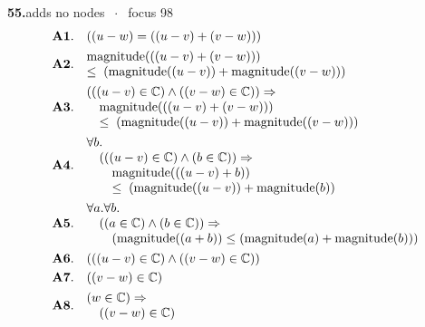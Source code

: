 \documentclass[11pt]{article}
\theoremstyle{plain}
\newcommand{\fit}[1]{\resizebox{\ifdim\width>\linewidth\linewidth\else\width\fi}{!}{#1}}
\begin{document}
\medskip\noindent\textbf{55.}\quad \fit{\texttt{(crs)}}\hfill{\small adds no nodes $\;\cdot\;$ focus 98}\\[2pt]
\begin{align*}
  \mathbf{A1.}\quad & ((u - w) = ((u - v) + (v - w))) \\
  \mathbf{A2.}\quad & \begin{array}{@{}l@{}} \operatorname{magnitude}(((u - v) + (v - w))) \\ \leq\; (\operatorname{magnitude}((u - v)) + \operatorname{magnitude}((v - w))) \end{array} \\
  \mathbf{A3.}\quad & \begin{array}{@{}l@{}} (((u - v) \in \mathbb{C}) \wedge ((v - w) \in \mathbb{C})) \Rightarrow  \\ \quad \operatorname{magnitude}(((u - v) + (v - w))) \\ \quad \leq\; (\operatorname{magnitude}((u - v)) + \operatorname{magnitude}((v - w))) \end{array} \\
  \mathbf{A4.}\quad & \begin{array}{@{}l@{}} \forall b. \\ \quad (((u - v) \in \mathbb{C}) \wedge (b \in \mathbb{C})) \Rightarrow  \\ \quad \quad \operatorname{magnitude}(((u - v) + b)) \\ \quad \quad \leq\; (\operatorname{magnitude}((u - v)) + \operatorname{magnitude}(b)) \end{array} \\
  \mathbf{A5.}\quad & \begin{array}{@{}l@{}} \forall a. \forall b. \\ \quad ((a \in \mathbb{C}) \wedge (b \in \mathbb{C})) \Rightarrow  \\ \quad \quad (\operatorname{magnitude}((a + b)) \leq (\operatorname{magnitude}(a) + \operatorname{magnitude}(b))) \end{array} \\
  \mathbf{A6.}\quad & (((u - v) \in \mathbb{C}) \wedge ((v - w) \in \mathbb{C})) \\
  \mathbf{A7.}\quad & ((v - w) \in \mathbb{C}) \\
  \mathbf{A8.}\quad & \begin{array}{@{}l@{}} (w \in \mathbb{C}) \Rightarrow  \\ \quad ((v - w) \in \mathbb{C}) \end{array} \\

\end{align*}
\end{document}
